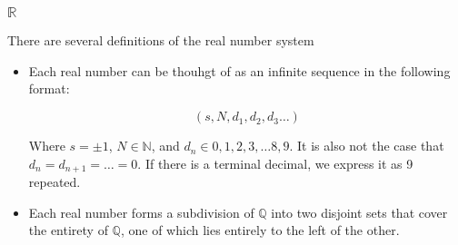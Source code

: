\documentclass[11 pt, twoside]{article}
\begin{document}
\subsubsection{$\mathbb{R}$}

There are several definitions of the real number system
\begin{itemize}
    \item Each real number can be thouhgt of as an infinite sequence in the
        following format:

        $$(s, N, d_1, d_2, d_3 \dots)$$

        Where $s = \pm 1$, $N \in \mathbb{N}$, and $d_n \in {0, 1, 2, 3,
        \dots 8, 9}$. It is also not the case that $d_n = d_{n+1} = \dots = 0$.
        If there is a terminal decimal, we express it as 9 repeated.
    \item Each real number forms a subdivision of $\mathbb{Q}$ into two
        disjoint sets that cover the entirety of $\mathbb{Q}$, one of which
        lies entirely to the left of the other.
\end{itemize}
\end{document}
